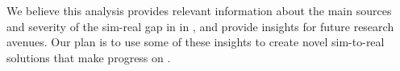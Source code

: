 We believe this analysis provides relevant information about the main sources and severity of the sim-real gap in \benchmark in \simulator, and provide insights for future research avenues.
Our plan is to use some of these insights to create novel sim-to-real solutions that make progress on \benchmark.





